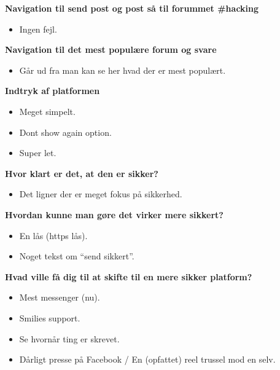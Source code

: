 \noindent\textbf{Navigation til send post og post så til forummet \#hacking}
\begin{itemize}
    \item Ingen fejl.
\end{itemize}

\noindent\textbf{Navigation til det mest populære forum og svare}
\begin{itemize}
    \item Går ud fra man kan se her hvad der er mest populært.
\end{itemize}

\noindent\textbf{Indtryk af platformen}
\begin{itemize}
    \item Meget simpelt.
    \item Dont show again option.
    \item Super let.
\end{itemize}

\noindent\textbf{Hvor klart er det, at den er sikker?}
\begin{itemize}
    \item Det ligner der er meget fokus på sikkerhed.
\end{itemize}

\noindent\textbf{Hvordan kunne man gøre det virker mere sikkert?}
\begin{itemize}
    \item En lås (https lås).
    \item Noget tekst om “send sikkert”.
\end{itemize}

\noindent\textbf{Hvad ville få dig til at skifte til en mere sikker platform?}
\begin{itemize}
    \item Mest messenger (nu).
    \item Smilies support.
    \item Se hvornår ting er skrevet.
    \item Dårligt presse på Facebook / En (opfattet) reel trussel mod en selv.
\end{itemize}